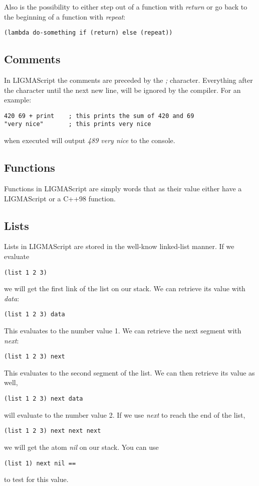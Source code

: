 \documentclass[12pt]{article}
\begin{document}
Also is the possibility to either step out of a function with \emph{return} or go back to the beginning of a 
function with \emph{repeat}:

\begin{verbatim}(lambda do-something if (return) else (repeat))\end{verbatim}

\subsection{Comments}
In LIGMAScript the comments are preceded by the \emph{;} character. Everything after the character until the next 
new line, will be ignored by the compiler. For an example:
\begin{Verbatim}
420 69 + print    ; this prints the sum of 420 and 69
"very nice"       ; this prints very nice
\end{Verbatim}
when executed will output \emph{489 very nice} to the console.

\subsection{Functions}

Functions in LIGMAScript are simply words that as their value either have a LIGMAScript or a C++98 
function.

\subsection{Lists}

Lists in LIGMAScript are stored in the well-know linked-list manner. If we evaluate
\begin{verbatim}(list 1 2 3)\end{verbatim}
we will get the first link of the list on our stack. We can retrieve its value with \emph{data}:
\begin{verbatim}(list 1 2 3) data\end{verbatim}
This evaluates to the number value 1. We can retrieve the next segment with \emph{next}:
\begin{verbatim}(list 1 2 3) next\end{verbatim}
This evaluates to the second segment of the list. We can then retrieve its value as well,
\begin{verbatim}(list 1 2 3) next data\end{verbatim}
will evaluate to the number value 2. If we use \emph{next} to reach the end of the list,
\begin{verbatim}(list 1 2 3) next next next\end{verbatim}
we will get the atom \emph{nil} on our stack. You can use 
\begin{verbatim}(list 1) next nil ==\end{verbatim}
to test for this value.
\end{document}
